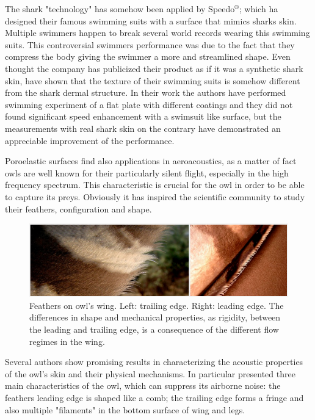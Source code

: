 The shark "technology" has somehow been applied by Speedo$^{\circledR}$; which ha designed their famous swimming suits with a surface that mimics sharks skin. Multiple swimmers happen to break several world records wearing this swimming suits.
This controversial swimmers performance was due to the fact that they compress the body giving the swimmer a more and streamlined shape.
Even thought the company has publicized their product as if it was a synthetic shark skin, \citet{Oeffner785} have shown that the texture of their swimming suits is somehow different from the shark dermal structure.
In their work the authors have performed swimming experiment of a flat plate with different coatings and they did not found significant speed enhancement with a swimsuit like surface, but the measurements with real shark skin on the contrary have demonstrated an appreciable improvement of the performance.

Poroelastic surfaces find also applications in aeroacoustics, as a matter of fact owls are well known for their particularly silent flight, especially in the high frequency spectrum.
This characteristic is crucial for the owl in order to be able to capture its preys.
Obviously it has inspired the scientific community to study their feathers, configuration and shape.

\begin{figure}[h]
	\centering
	\includegraphics[width=0.8\linewidth]{chapter_1/howl}
	\caption{Feathers on owl's wing. Left: trailing edge. Right: leading edge. The differences in shape and mechanical properties, as rigidity, between the leading and trailing edge, is a consequence of the different flow regimes in the wing.}
	\label{fig:owl}
\end{figure}
 
Several authors show promising results in characterizing the acoustic properties of the owl's skin and their physical mechanisms.
In particular \citet{lilley1998} presented three main characteristics of the owl, which can suppress its airborne noise: the feathers leading edge is shaped like a comb; the trailing edge forms a fringe and also multiple "filaments" in the bottom surface of wing and legs.

